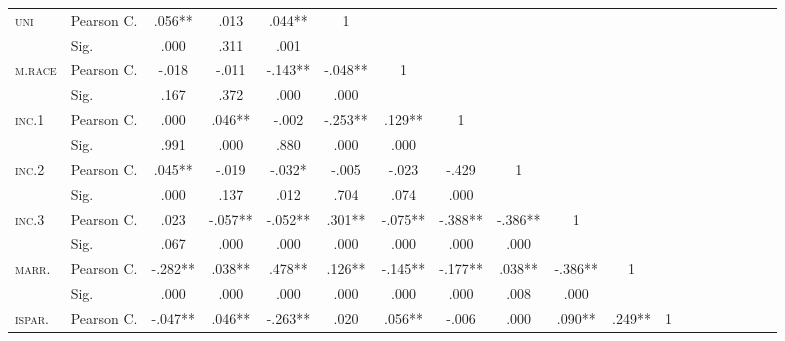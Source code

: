 \begin{sidewaystable}
\begin{minipage}[t]{1\columnwidth}
\begin{center}
\begin{tabular}{|l|l|c|c|c|c|c|c|c|c|c|c|c|c|c|c|c|c|c|}
\hline 
\multirow{2}{*}{\textsc{\scriptsize{}uni}} & {\tiny{}Pearson C.} & {\tiny{}.056{*}{*}} & {\tiny{}.013} & {\tiny{}.044{*}{*}} & {\tiny{}1} &  &  &  &  &  &  &  &  &  &  &  &  & \tabularnewline
\cline{2-19} 
 & {\tiny{}Sig.} & {\tiny{}.000} & {\tiny{}.311} & {\tiny{}.001} &  &  &  &  &  &  &  &  &  &  &  &  &  & \tabularnewline
\hline 
\multirow{2}{*}{\textsc{\scriptsize{}m.race}} & {\tiny{}Pearson C.} & {\tiny{}-.018} & {\tiny{}-.011} & {\tiny{}-.143{*}{*}} & {\tiny{}-.048{*}{*}} & {\tiny{}1} &  &  &  &  &  &  &  &  &  &  &  & \tabularnewline
\cline{2-19} 
 & {\tiny{}Sig.} & {\tiny{}.167} & {\tiny{}.372} & {\tiny{}.000} & {\tiny{}.000} &  &  &  &  &  &  &  &  &  &  &  &  & \tabularnewline
\hline 
\multirow{2}{*}{\textsc{\scriptsize{}inc.1}} & {\tiny{}Pearson C.} & {\tiny{}.000} & {\tiny{}.046{*}{*}} & {\tiny{}-.002} & {\tiny{}-.253{*}{*}} & {\tiny{}.129{*}{*}} & {\tiny{}1} &  &  &  &  &  &  &  &  &  &  & \tabularnewline
\cline{2-19} 
 & {\tiny{}Sig.} & {\tiny{}.991} & {\tiny{}.000} & {\tiny{}.880} & {\tiny{}.000} & {\tiny{}.000} &  &  &  &  &  &  &  &  &  &  &  & \tabularnewline
\hline 
\multirow{2}{*}{\textsc{\scriptsize{}inc.2}} & {\tiny{}Pearson C.} & {\tiny{}.045{*}{*}} & {\tiny{}-.019} & {\tiny{}-.032{*}} & {\tiny{}-.005} & {\tiny{}-.023} & {\tiny{}-.429} & {\tiny{}1} &  &  &  &  &  &  &  &  &  & \tabularnewline
\cline{2-19} 
 & {\tiny{}Sig.} & {\tiny{}.000} & {\tiny{}.137} & {\tiny{}.012} & {\tiny{}.704} & {\tiny{}.074} & {\tiny{}.000} &  &  &  &  &  &  &  &  &  &  & \tabularnewline
\hline 
\multirow{2}{*}{\textsc{\scriptsize{}inc.3}} & {\tiny{}Pearson C.} & {\tiny{}.023} & {\tiny{}-.057{*}{*}} & {\tiny{}-.052{*}{*}} & {\tiny{}.301{*}{*}} & {\tiny{}-.075{*}{*}} & {\tiny{}-.388{*}{*}} & {\tiny{}-.386{*}{*}} & {\tiny{}1} &  &  &  &  &  &  &  &  & \tabularnewline
\cline{2-19} 
 & {\tiny{}Sig.} & {\tiny{}.067} & {\tiny{}.000} & {\tiny{}.000} & {\tiny{}.000} & {\tiny{}.000} & {\tiny{}.000} & {\tiny{}.000} &  &  &  &  &  &  &  &  &  & \tabularnewline
\hline 
\multirow{2}{*}{\textsc{\scriptsize{}marr.}} & {\tiny{}Pearson C.} & {\tiny{}-.282{*}{*}} & {\tiny{}.038{*}{*}} & {\tiny{}.478{*}{*}} & {\tiny{}.126{*}{*}} & {\tiny{}-.145{*}{*}} & {\tiny{}-.177{*}{*}} & {\tiny{}.038{*}{*}} & {\tiny{}-.386{*}{*}} & {\tiny{}1} &  &  &  &  &  &  &  & \tabularnewline
\cline{2-19} 
 & {\tiny{}Sig.} & {\tiny{}.000} & {\tiny{}.000} & {\tiny{}.000} & {\tiny{}.000} & {\tiny{}.000} & {\tiny{}.000} & {\tiny{}.008} & {\tiny{}.000} &  &  &  &  &  &  &  &  & \tabularnewline
\hline 
\multirow{2}{*}{\textsc{\scriptsize{}ispar.}} & {\tiny{}Pearson C.} & {\tiny{}-.047{*}{*}} & {\tiny{}.046{*}{*}} & {\tiny{}-.263{*}{*}} & {\tiny{}.020} & {\tiny{}.056{*}{*}} & {\tiny{}-.006} & {\tiny{}.000} & {\tiny{}.090{*}{*}} & {\tiny{}.249{*}{*}} & {\tiny{}1} &  &  &  &  &  &  & \tabularnewline

\end{tabular}
\end{center}
\end{minipage}
\end{sidewaystable}

